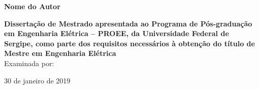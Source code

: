 \documentclass[
	    12pt,				%
	    openright,			%
	    oneside,			%
	    a4paper,			%
	english,			%
	french,				%
	spanish,			%
	brazil,				%
	]{abntex2}
\begin{document}
\begin{folhadeaprovacao}

  \begin{center}
  
  
    
    {\ABNTEXchapterfont\bfseries\imprimirtitulo}
    \vspace*{1.5cm}
    
    {\ABNTEXchapterfont\large{\textbf{Nome do Autor}}}
    \vspace*{1cm}

  \end{center}
  
\noindent \textbf{Dissertação de Mestrado apresentada ao Programa de Pós-graduação em Engenharia Elétrica – PROEE, da
Universidade Federal de Sergipe, como parte dos requisitos necessários à obtenção do título de Mestre em Engenharia Elétrica} \\


\noindent Examinada por:

    
   \begin{center}
    \vspace{1.0cm}
    {\large\imprimirlocal}
    \par
    {\large{30 de janeiro de 2019}}
  \end{center}
  
\end{folhadeaprovacao}
\end{document}
